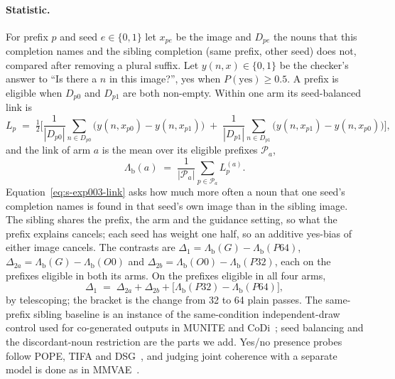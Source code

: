 \documentclass[acmsmall,screen]{acmart}
\begin{document}
\paragraph{Statistic.}
For prefix $p$ and seed $e\in\{0,1\}$ let $x_{pe}$ be the image and $D_{pe}$ the nouns that this completion names and the sibling completion (same prefix, other seed) does not, compared after removing a plural suffix. Let $y(n,x)\in\{0,1\}$ be the checker's answer to ``Is there a $n$ in this image?'', yes when $P(\text{yes})\ge 0.5$. A prefix is eligible when $D_{p0}$ and $D_{p1}$ are both non-empty. Within one arm its seed-balanced link is
\begin{equation}
  L_p \;=\; \tfrac12\Biggl[\frac{1}{|D_{p0}|}\sum_{n\in D_{p0}}\bigl(y(n,x_{p0})-y(n,x_{p1})\bigr)\;+\;\frac{1}{|D_{p1}|}\sum_{n\in D_{p1}}\bigl(y(n,x_{p1})-y(n,x_{p0})\bigr)\Biggr],
  \label{eq:s-exp003-link}
\end{equation}
and the link of arm $a$ is the mean over its eligible prefixes $\mathcal P_a$,
\begin{equation}
  \Lambda_{\mathrm b}(a) \;=\; \frac{1}{|\mathcal P_a|}\sum_{p\in\mathcal P_a} L_p^{(a)} .
  \label{eq:s-exp003-lambda}
\end{equation}
Equation~\eqref{eq:s-exp003-link} asks how much more often a noun that one seed's completion names is found in that seed's own image than in the sibling image. The sibling shares the prefix, the arm and the guidance setting, so what the prefix explains cancels; each seed has weight one half, so an additive yes-bias of either image cancels. The contrasts are $\Delta_1=\Lambda_{\mathrm b}(G)-\Lambda_{\mathrm b}(P64)$, $\Delta_{2a}=\Lambda_{\mathrm b}(G)-\Lambda_{\mathrm b}(O0)$ and $\Delta_{2b}=\Lambda_{\mathrm b}(O0)-\Lambda_{\mathrm b}(P32)$, each on the prefixes eligible in both its arms. On the prefixes eligible in all four arms,
\begin{equation}
  \Delta_1 \;=\; \Delta_{2a}+\Delta_{2b}+\bigl[\Lambda_{\mathrm b}(P32)-\Lambda_{\mathrm b}(P64)\bigr],
  \label{eq:s-exp003-identity}
\end{equation}
by telescoping; the bracket is the change from 32 to 64 plain passes. %
The same-prefix sibling baseline is an instance of the same-condition independent-draw control used for co-generated outputs in MUNITE and CoDi~\cite{arXiv:2610.09866,arXiv:2305.11846}; seed balancing and the discordant-noun restriction are the parts we add. Yes/no presence probes follow POPE, TIFA and DSG~\cite{arXiv:2305.10355,arXiv:2303.11897,arXiv:2310.18235}, and judging joint coherence with a separate model is done as in MMVAE~\cite{arXiv:1911.03393}. %
\end{document}
